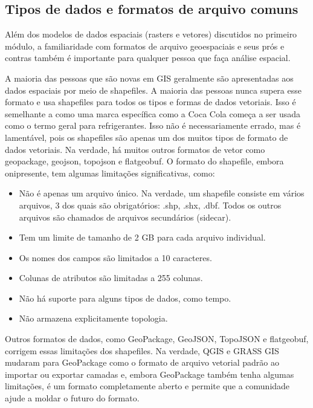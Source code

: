 \documentclass[
  portuguese,
]{krantz}
\providecommand{\tightlist}{%
  \setlength{\itemsep}{0pt}\setlength{\parskip}{0pt}}
\begin{document}
\hypertarget{tipos-de-dados-e-formatos-de-arquivo-comuns}{%
\subsection{Tipos de dados e formatos de arquivo comuns}\label{tipos-de-dados-e-formatos-de-arquivo-comuns}}

Além dos modelos de dados espaciais (rasters e vetores) discutidos no primeiro módulo, a familiaridade com formatos de arquivo geoespaciais e seus prós e contras também é importante para qualquer pessoa que faça análise espacial.

A maioria das pessoas que são novas em GIS geralmente são apresentadas aos dados espaciais por meio de shapefiles. A maioria das pessoas nunca supera esse formato e usa shapefiles para todos os tipos e formas de dados vetoriais. Isso é semelhante a como uma marca específica como a Coca Cola começa a ser usada como o termo geral para refrigerantes. Isso não é necessariamente errado, mas é lamentável, pois os shapefiles são apenas um dos muitos tipos de formato de dados vetoriais. Na verdade, há muitos outros formatos de vetor como geopackage, geojson, topojson e flatgeobuf. O formato do shapefile, embora onipresente, tem algumas limitações significativas, como:

\begin{itemize}
\tightlist
\item
  Não é apenas um arquivo único. Na verdade, um shapefile consiste em vários arquivos, 3 dos quais são obrigatórios: .shp, .shx, .dbf. Todos os outros arquivos são chamados de arquivos secundários (sidecar).
\item
  Tem um limite de tamanho de 2 GB para cada arquivo individual.
\item
  Os nomes dos campos são limitados a 10 caracteres.
\item
  Colunas de atributos são limitadas a 255 colunas.
\item
  Não há suporte para alguns tipos de dados, como tempo.
\item
  Não armazena explicitamente topologia.
\end{itemize}

Outros formatos de dados, como GeoPackage, GeoJSON, TopoJSON e flatgeobuf, corrigem essas limitações dos shapefiles. Na verdade, QGIS e GRASS GIS mudaram para GeoPackage como o formato de arquivo vetorial padrão ao importar ou exportar camadas e, embora GeoPackage também tenha algumas limitações, é um formato completamente aberto e permite que a comunidade ajude a moldar o futuro do formato.
\end{document}
